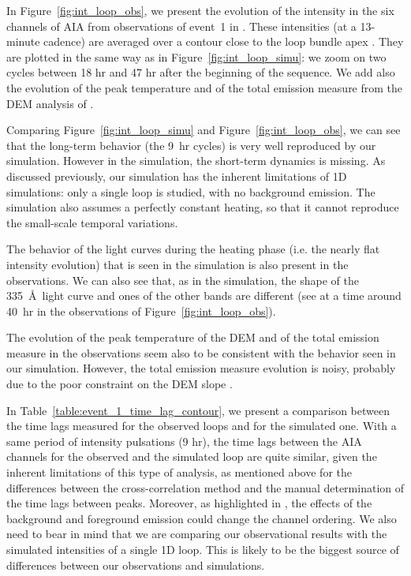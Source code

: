 \documentclass[preprint2]{aastex6}
\begin{document}
In Figure~\ref{fig:int_loop_obs}, we present the evolution of the intensity in the six channels of AIA from observations of event~1 in \citet{froment2015}. These intensities (at a 13-minute cadence) are averaged over a contour close to the loop bundle apex  \citep[see Figures 1 and 2 of ][]{froment2015}. They are plotted in the same way as in Figure~\ref{fig:int_loop_simu}: we zoom on two cycles between 18 hr and 47 hr after the beginning of the sequence. We add also the evolution of the peak temperature and of the total emission measure from the DEM analysis of \citet[][see Figure 2]{froment2015}.

Comparing Figure~\ref{fig:int_loop_simu} and Figure~\ref{fig:int_loop_obs}, we can see that the long-term behavior (the 9~hr cycles) is very well reproduced by our simulation. However in the simulation, the short-term dynamics is missing. As discussed previously, our simulation has the inherent limitations of 1D simulations: only a single loop is studied, with no background emission. The simulation also assumes a perfectly constant heating, so that it cannot reproduce the small-scale temporal variations.

The behavior of the light curves during the heating phase (i.e. the nearly flat intensity evolution) that is seen in the simulation is also present in the observations. We can also see that, as in the simulation, the shape of the 335~\AA~light curve and ones of the other bands are different (see at a time around 40~hr in the observations of Figure~\ref{fig:int_loop_obs}).

The evolution of the peak temperature of the DEM and of the total emission measure in the observations seem also to be consistent with the behavior seen in our simulation. However, the total emission measure evolution is noisy, probably due to the poor constraint on the DEM slope \citep[see the discussion in][]{froment2015}.

\medskip

In Table~\ref{table:event_1_time_lag_contour}, we present a comparison between the time lags measured for the observed loops \citep{froment2015} and for the simulated one. With a same period of intensity pulsations (9 hr), the time lags between the AIA channels for the observed and the simulated loop are quite similar, given the inherent limitations of this type of analysis, as mentioned above for the differences between the cross-correlation method and the manual determination of the time lags between peaks. Moreover, as highlighted in \citet[see Table~1]{froment2015}, the effects of the background and foreground emission could change the channel ordering. We also need to bear in mind that we are comparing our observational results with the simulated intensities of a single 1D loop. This is likely to be the biggest source of differences between our observations and simulations.
\end{document}
